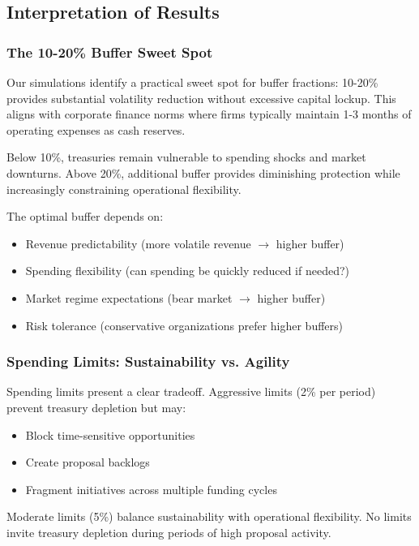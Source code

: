 
\subsection{Interpretation of Results}

\subsubsection{The 10-20\% Buffer Sweet Spot}

Our simulations identify a practical sweet spot for buffer fractions: 10-20\% provides substantial volatility reduction without excessive capital lockup. This aligns with corporate finance norms where firms typically maintain 1-3 months of operating expenses as cash reserves.

Below 10\%, treasuries remain vulnerable to spending shocks and market downturns. Above 20\%, additional buffer provides diminishing protection while increasingly constraining operational flexibility.

The optimal buffer depends on:
\begin{itemize}
    \item Revenue predictability (more volatile revenue $\rightarrow$ higher buffer)
    \item Spending flexibility (can spending be quickly reduced if needed?)
    \item Market regime expectations (bear market $\rightarrow$ higher buffer)
    \item Risk tolerance (conservative organizations prefer higher buffers)
\end{itemize}

\subsubsection{Spending Limits: Sustainability vs. Agility}

Spending limits present a clear tradeoff. Aggressive limits (2\% per period) prevent treasury depletion but may:
\begin{itemize}
    \item Block time-sensitive opportunities
    \item Create proposal backlogs
    \item Fragment initiatives across multiple funding cycles
\end{itemize}

Moderate limits (5\%) balance sustainability with operational flexibility. No limits invite treasury depletion during periods of high proposal activity.

